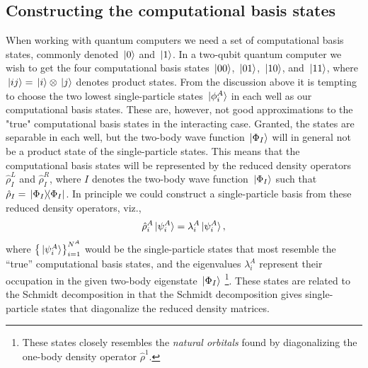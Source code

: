 \documentclass[twocolumn,superscriptaddress,unsortedaddress,
 amsmath,amssymb,
 aps,
]{revtex4-2}
\begin{document}
    \subsection{Constructing the computational basis states}
        When working with quantum computers we need a set of computational
        basis states, commonly denoted $\ket*{0}$ and $\ket*{1}$.
        In a two-qubit quantum computer we wish to get the four computational
        basis states $\ket*{00}$, $\ket*{01}$, $\ket*{10}$, and $\ket*{11}$,
        where $\ket*{ij} = \ket*{i} \otimes \ket*{j}$ denotes product states.
        From the discussion above it is tempting to choose the two lowest
        single-particle states $\ket*{\phi^{A}_i}$ in each well as our
        computational basis states.
        These are, however, not good approximations to the "true" computational
        basis states in the interacting case.
        Granted, the states are separable in each well, but the two-body
        wave function $\ket*{\Phi_I}$ will in general not be a product state
        of the single-particle states.
        This means that the computational basis states will be represented by
        the reduced density operators $\hat{\rho}^L_I$ and $\hat{\rho}^R_I$,
        where $I$ denotes the two-body wave function $\ket*{\Phi_I}$ such that
        $\hat{\rho}_I = \dyad*{\Phi_I}{\Phi_I}$.
        In principle we could construct a single-particle basis from these
        reduced density operators, viz.,
        \begin{align*}
            \hat{\rho}^A_i \ket*{\psi^A_i}
            = \lambda^A_i \ket*{\psi^A_i},
        \end{align*}
        where $\qty{\ket*{\psi^A_i}}_{i = 1}^{N^A}$ would be the single-particle
        states that most resemble the ``true'' computational basis states,
        and the eigenvalues $\lambda^A_i$ represent their occupation
        in the given two-body eigenstate $\ket*{\Phi_I}$ \footnote{
            These states closely resembles the \emph{natural orbitals}
            found by diagonalizing the one-body density operator $\hat{\rho}^1$.
        }.
        These states are related to the Schmidt decomposition in that the
        Schmidt decomposition gives single-particle states that diagonalize
        the reduced density matrices.
 
\end{document}
